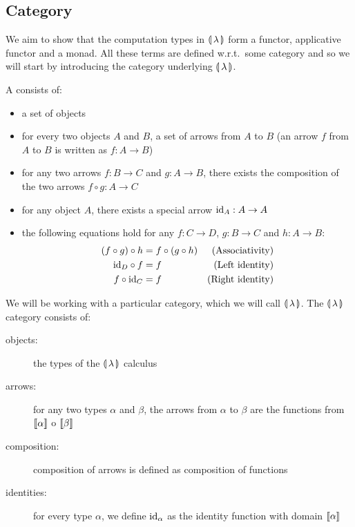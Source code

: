 \subsection{Category}
\label{ssec:category}

We aim to show that the computation types in $\llparenthesis \, \lambda \, \rrparenthesis$ form a
functor, applicative functor and a monad. All these terms are defined
w.r.t.\ some category and so we will start by introducing the category
underlying $\llparenthesis \, \lambda \, \rrparenthesis$.

\begin{definition}
 A  consists of:
\begin{itemize}
\item a set of objects
\item for every two objects $A$ and $B$, a set of arrows from $A$ to $B$
  (an arrow $f$ from $A$ to $B$ is written as $f : A \to B$)
\item for any two arrows $f : B \to C$ and $g : A \to B$, there exists the
  composition of the two arrows $f \circ g : A \to C$
\item for any object $A$, there exists a special arrow $\mathrm{id}_A : A \to A$
\item the following equations hold for any $f : C \to D$, $g : B \to C$ and
  $h : A \to B$:
  \begin{align}
    \label{law:cat-associativity}(f \circ g) \circ h &= f \circ (g \circ h) & \text{(Associativity)} \\
    \label{law:cat-left-identity}\mathrm{id}_D \circ f &= f & \text{(Left identity)} \\
    \label{law:cat-right-identity}f \circ \mathrm{id}_C &= f & \text{(Right identity)}
  \end{align}
\end{itemize}
\end{definition}

We will be working with a particular category, which we will call
$\llparenthesis \, \lambda \, \rrparenthesis$. The $\llparenthesis \, \lambda \, \rrparenthesis$ category consists of:
\begin{description}
\item[objects:] the types of the $\llparenthesis \, \lambda \, \rrparenthesis$ calculus
\item[arrows:] for any two types $\alpha$ and $\beta$, the arrows from
  $\alpha$ to $\beta$ are the functions from $\llbracket \alpha \rrbracket$ o
  $\llbracket \beta \rrbracket$
\item[composition:] composition of arrows is defined as composition of functions
\item[identities:] for every type $\alpha$, we define $\mathrm{id}_\alpha$ as the
  identity function with domain $\llbracket \alpha \rrbracket$
\end{description}

